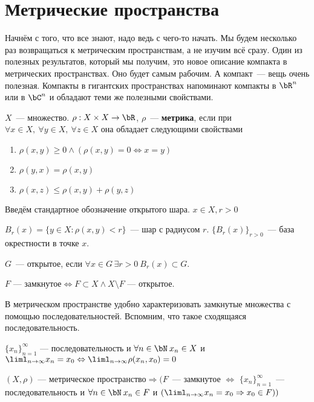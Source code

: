 \documentclass[document]{subfiles}
\begin{document}
\chapter{Метрические пространства}
Начнём с того, что все знают, надо ведь с чего-то начать. Мы будем несколько раз возвращаться к метрическим пространствам, а не изучим всё сразу. Один из полезных результатов, который мы получим, это новое описание компакта в метрических пространствах. Оно будет
самым рабочим. А компакт~--- вещь очень полезная. Компакты в гигантских пространствах напоминают компакты в $\bR^n$ или в $\bC^n$ и обладают теми же полезными свойствами.

\begin{definition}[Метрика]
    $X$~--- множество. $\rho: X \times X \rightarrow \bR$, $\rho$~--- \textbf{метрика}, если при $\forall x \in X, \: \forall y \in X, \: \forall z \in X$ она обладает следующими свойствами 
    \begin{enumerate}
        \item $\rho(x,y) \geq 0 \land (\rho(x,y) = 0 \Leftrightarrow x = y)$
        \item $\rho(y,x) = \rho(x,y)$
        \item $\rho(x,z) \leq \rho(x,y) + \rho(y,z)$
    \end{enumerate}
\end{definition}

Введём стандартное обозначение открытого шара. $x \in X, r > 0$

$B_r(x) = \{y \in X: \rho(x,y) < r \}$~--- шар с радиусом $r$.
$ \{B_r(x) \}_{r > 0}$~--- база окрестности в точке $x$.

$G$~--- открытое, если $\forall x \in G \, \exists r > 0\: B_r(x) \subset G$.

$F \text{~--- замкнутое} \Leftrightarrow F \subset X \land X \setminus F\text{~--- открытое}$.

В метрическом пространстве удобно характеризовать замкнутые множества с помощью последовательностей. Вспомним, что такое сходящаяся последовательность.

$\{x_n\}_{n=1}^\infty\text{~--- последовательность}$ и $\forall n \in \bN \: x_n \in X$ и  $\liml_{n \to \infty} x_n = x_0 \Leftrightarrow \liml_{n \to \infty} \rho(x_n, x_0) = 0$

$(X, \rho)\text{~--- метрическое пространство} \Rightarrow (F$~--- замкнутое $\Leftrightarrow$ $\{x_n\}_{n=1}^\infty$~--- последовательность и $\forall n \in \bN \: x_n \in F$ и $(\liml_{n \to \infty } x_n = x_0 \Rightarrow x_0 \in F))$
\end{document}
